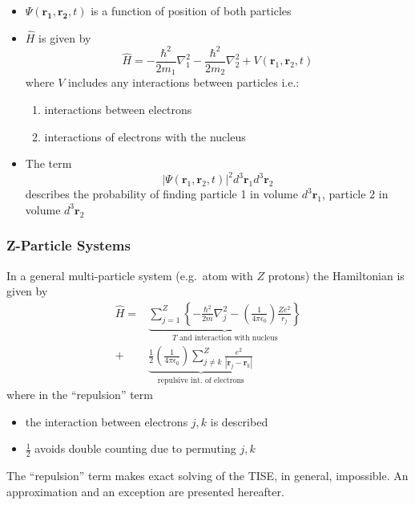 \newpar{}
\begin{itemize}
    \item $\Psi(\mathbf{r_1},\mathbf{r_2},t)$ is a function of position of both particles
    \item $\widehat{H}$ is given by
          \begin{equation*}
              \widehat{H}=-\frac{\hbar^{2}}{2m_{1}}\nabla_{1}^{2}-\frac{\hbar^{2}}{2m_{2}}\nabla_{2}^{2}+V(\mathbf{r}_{1},\mathbf{r}_{2},t)
          \end{equation*}
          where $V$ includes any interactions between particles i.e.:
          \begin{enumerate}
              \item interactions between  electrons
              \item interactions of electrons with the nucleus
          \end{enumerate}
    \item The term
          \begin{equation*}
              |\Psi(\mathbf{r}_{1},\mathbf{r}_{2},t)|^{2} d^{3}\mathbf{r}_{1} d^{3}\mathbf{r}_{2}
          \end{equation*}
          describes the probability of finding particle 1 in volume $d^{3}\mathbf{r}_{1}$, particle 2 in volume $d^{3}\mathbf{r}_{2}$
\end{itemize}

\subsubsection{Z-Particle Systems}
In a general multi-particle system (e.g.\ atom with $Z$ protons) the Hamiltonian is given by
\begin{align*}
    \widehat{H} = & \underbrace{\sum_{j=1}^{Z}\left\{-\frac{\hbar^{2}}{2m}\nabla_{j}^{2}-\left(\frac{1}{4\pi \epsilon_{0}}\right)\frac{Ze^{2}}{r_{j}}\right\}}_{T\text{ and interaction with nucleus}} \\
    +             & \underbrace{\frac{1}{2}\left(\frac{1}{4\pi \epsilon_{0}}\right)\sum_{j\neq k}^{Z}\frac{e^{2}}{\left|\mathbf{r}_{j}-\mathbf{r}_{k}\right|}}_{\text{repulsive int.\ of electrons}}
\end{align*}
where in the ``repulsion'' term
\begin{itemize}
    \item the interaction between electrons $j,k$ is described
    \item $\frac{1}{2}$ avoids double counting due to permuting $j,k$
\end{itemize}
The ``repulsion'' term makes exact solving of the TISE, in general, impossible. An approximation and an exception are presented hereafter.

